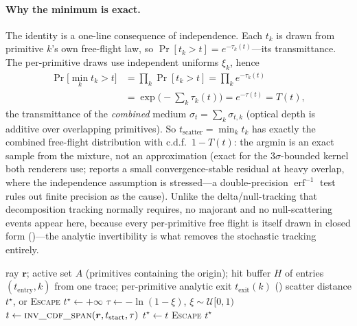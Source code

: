 \paragraph{Why the minimum is exact.} The identity is a one-line consequence of independence. Each $t_k$
is drawn from primitive $k$'s own free-flight law, so $\Pr[t_k > t] = e^{-\tau_k(t)}$---its
transmittance. The per-primitive draws use independent uniforms $\xi_k$, hence
\[
\begin{aligned}
  \Pr\!\big[\min_k t_k > t\big]
  &= \prod_k \Pr[t_k > t] = \prod_k e^{-\tau_k(t)} \\
  &= \exp\!\Big(-\!\sum_k \tau_k(t)\Big) = e^{-\tau(t)} = T(t),
\end{aligned}
\]
the transmittance of the \emph{combined} medium $\sigma_t=\sum_k\sigma_{t,k}$ (optical depth is additive
over overlapping primitives). So $t_{\text{scatter}}=\min_k t_k$ has exactly the combined free-flight
distribution with c.d.f.\ $1-T(t)$: the argmin is an exact sample from the mixture, not an
approximation (exact for the $3\sigma$-bounded kernel both renderers use;  reports a
small convergence-stable residual at heavy overlap, where the independence assumption is stressed---a
double-precision $\operatorname{erf}^{-1}$ test rules out finite precision as the cause). Unlike the delta/null-tracking that decomposition tracking normally requires, no majorant
and no null-scattering events appear here, because every per-primitive free flight is itself drawn in
closed form ()---the analytic invertibility is what removes the stochastic
tracking entirely.

\begin{algorithm}[htp]
\caption{Argmin scatter sampling for one ray (one path bounce).}
\label{alg:argmin}
\begin{algorithmic}[1]
\Require ray $\bm{r}$; active set $A$ (primitives containing the origin); hit buffer $H$ of entries
$(t_{\text{entry}}, k)$ from one trace; per-primitive analytic exit $t_{\text{exit}}(k)$ ()
\Ensure scatter distance $t^\star$, or \textsc{Escape}
\State $t^\star \gets +\infty$
 
  \State $\tau \gets -\ln(1-\xi)$, \quad $\xi \sim \mathcal{U}[0,1)$ 
  \State $t \gets \textproc{inv\_cdf\_span}(\bm{r}, t_{\text{start}}, \tau)$ 
    \State $t^\star \gets t$ 
  \EndIf
\EndFunction
{}
  \State {} 
\EndFor
{}
  \State {} 
\EndFor
{} \State \Return \textsc{Escape} \EndIf
\State \Return $t^\star$
\end{algorithmic}
\end{algorithm}


